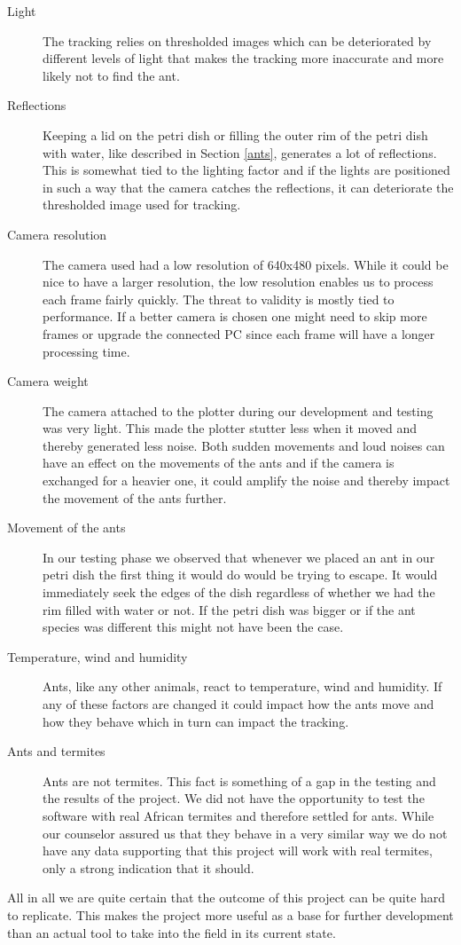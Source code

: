 \begin{description}
\item[Light] The tracking relies on thresholded images which can be deteriorated by different levels of light that makes the tracking more inaccurate and more likely not to find the ant. \\

\item[Reflections] Keeping a lid on the petri dish or filling the outer rim of the petri dish with water, like described in Section \ref{ants}, generates a lot of reflections. This is somewhat tied to the lighting factor and if the lights are positioned in such a way that the camera catches the reflections, it can deteriorate the thresholded image used for tracking. \\

\item[Camera resolution] The camera used had a low resolution of 640x480 pixels. While it could be nice to have a larger resolution, the low resolution enables us to process each frame fairly quickly. The threat to validity is mostly tied to performance. If a better camera is chosen one might need to skip more frames or upgrade the connected PC since each frame will have a longer processing time. \\

\item[Camera weight] The camera attached to the plotter during our development and testing was very light. This made the plotter stutter less when it moved and thereby generated less noise. Both sudden movements and loud noises can have an effect on the movements of the ants and if the camera is exchanged for a heavier one, it could amplify the noise and thereby impact the movement of the ants further. \\

\item[Movement of the ants] In our testing phase we observed that whenever we placed an ant in our petri dish the first thing it would do would be trying to escape. It would immediately seek the edges of the dish regardless of whether we had the rim filled with water or not. If the petri dish was bigger or if the ant species was different this might not have been the case. \\

\item[Temperature, wind and humidity] Ants, like any other animals, react to temperature, wind and humidity. If any of these factors are changed it could impact how the ants move and how they behave which in turn can impact the tracking. \\  

\item[Ants and termites] Ants are not termites. This fact is something of a gap in the testing and the results of the project. We did not have the opportunity to test the software with real African termites and therefore settled for ants. While our counselor assured us that they behave in a very similar way we do not have any data supporting that this project will work with real termites, only a strong indication that it should.

\end{description}

All in all we are quite certain that the outcome of this project can be quite hard to replicate. This makes the project more useful as a base for further development than an actual tool to take into the field in its current state. 
